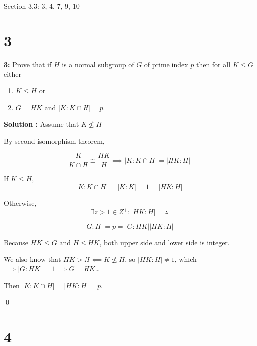\documentclass[11pt]{article}
\newcommand{\AND}{\text{ and }}
\newenvironment{exercise}[1]
	{\noindent \textbf{#1:}}
	{\par \vspace{0.5\baselineskip}}
\newenvironment{solution}[1][\unskip]
	{\noindent \textbf{Solution #1:} }
	{\qed \pagebreak}
\begin{document}


\begin{center}
\end{center}



Section 3.3: 3, 4, 7, 9, 10

\section*{3}

\begin{exercise}{3}
	Prove that if $H$ is a normal subgroup of $G$ of prime index $p$ then for all $K \le G$ either
	\begin{enumerate}
		\item $K\leqslant H$ or
		\item $G=HK$ and $|K:K \cap H| = p$.
	\end{enumerate}
\end{exercise}

\begin{solution}
	Assume that $K \not\le H$

	By second isomorphism theorem,

	\[
		\frac{K}{K \cap H} \cong \frac{HK}{H}
		\implies |K:K \cap H| = |HK:H|
	\]

	If $K \le H$,
	\[
		|K:K \cap H| = |K:K| = 1 = |HK : H|
	\]

	Otherwise,
	\[
		\exists z > 1 \in Z^+ : |HK : H| = z
	\]

	\[
	  |G : H| = p = {|G : HK|}{|HK : H|}
	\]

	Because $HK \le G \AND H \le HK$, both upper side and lower side is integer.

	We also know that $HK > H \impliedby K \not\le H$,
	so $|HK : H| \neq 1$,
	which $\implies |G:HK|=1 \implies G = HK$\dots

	Then $|K : K \cap H| = |HK : H| = p$.

\end{solution}

\section*{4}
\end{document}
